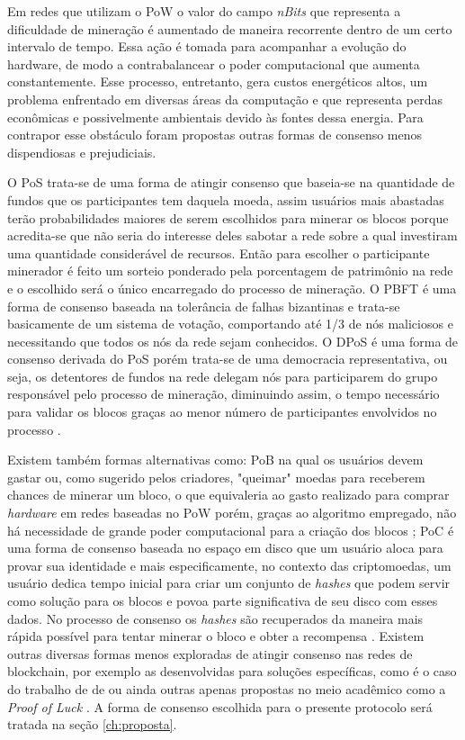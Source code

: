 Em redes que utilizam o \ac{PoW} o valor do campo \textit{nBits} que representa a dificuldade de mineração é aumentado de maneira recorrente dentro de um certo intervalo de tempo. Essa ação é tomada para acompanhar a evolução do hardware, de modo a contrabalancear o poder computacional que aumenta constantemente. Esse processo, entretanto, gera custos energéticos altos, um problema enfrentado em diversas áreas da computação e que representa perdas econômicas e possivelmente ambientais devido às fontes dessa energia. Para contrapor esse obstáculo foram propostas outras formas de consenso menos dispendiosas e prejudiciais.

%
O \ac{PoS} trata-se de uma forma de atingir consenso que baseia-se na quantidade de fundos que os participantes tem daquela moeda, assim usuários mais abastadas terão probabilidades maiores de serem escolhidos para minerar os blocos porque acredita-se que não seria do interesse deles sabotar a rede sobre a qual investiram uma quantidade considerável de recursos. Então para escolher o participante minerador é feito um sorteio ponderado pela porcentagem de patrimônio na rede e o escolhido será o único encarregado do processo de mineração. 
%
O \ac{PBFT} é uma forma de consenso baseada na tolerância de falhas bizantinas e trata-se basicamente de um sistema de votação, comportando até 1/3 de nós maliciosos e necessitando que todos os nós da rede sejam conhecidos. O \ac{DPoS} é uma forma de consenso derivada do \ac{PoS} porém trata-se de uma democracia representativa, ou seja, os detentores de fundos na rede delegam nós para participarem do grupo responsável pelo processo de mineração, diminuindo assim, o tempo necessário para validar os blocos graças ao menor número de participantes envolvidos no processo \cite{blockchain:survey}. 

%
Existem também formas alternativas como: \ac{PoB} na qual os usuários devem gastar ou, como sugerido pelos criadores, "queimar" moedas para receberem chances de minerar um bloco, o que equivaleria ao gasto realizado para comprar \textit{hardware} em redes baseadas no \ac{PoW} porém, graças ao algoritmo empregado, não há necessidade de grande poder computacional para a criação dos blocos \cite{blockchain:PoB}; \ac{PoC} é uma forma de consenso baseada no espaço em disco que um usuário aloca para provar sua identidade \cite{blockchain:origem_PoC} e mais especificamente, no contexto das criptomoedas, um usuário dedica tempo inicial para criar um conjunto de \textit{hashes} que podem servir como solução para os blocos e povoa parte significativa de seu disco com esses dados. No processo de consenso os \textit{hashes} são recuperados da maneira mais rápida possível para tentar minerar o bloco e obter a recompensa \cite{blockchain:burstcoin_PoC}. Existem outras diversas formas menos exploradas de atingir consenso nas redes de blockchain, por exemplo as desenvolvidas para soluções específicas, como é o caso do trabalho de \citeauthor{blockchain:energia_dc} de \citeyear{blockchain:energia_dc} ou ainda outras apenas propostas no meio acadêmico como a \textit{Proof of Luck} \cite{blockchain:PoL}. A forma de consenso escolhida para o presente protocolo será tratada na seção \ref{ch:proposta}.

